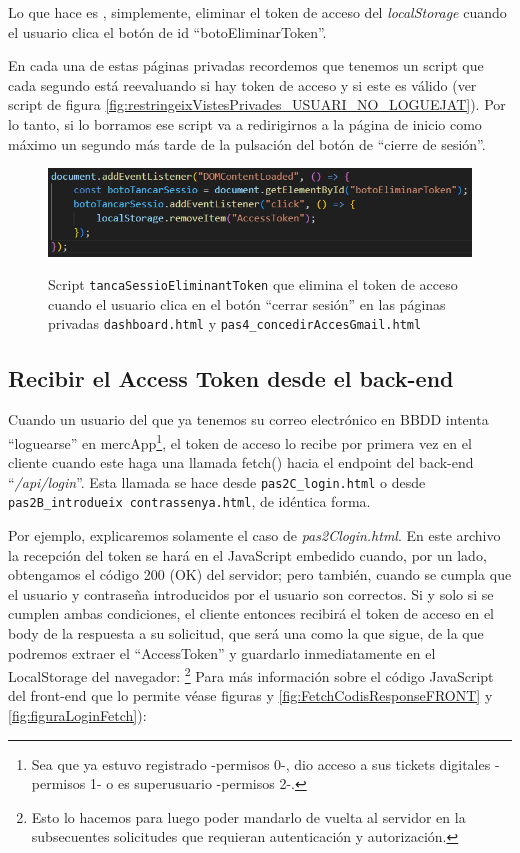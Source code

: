 \documentclass[a4paper,12pt]{report}
\begin{document}
	Lo que hace es , simplemente, eliminar el token de acceso del \textit{localStorage} cuando el usuario clica el botón de id ``botoEliminarToken''. 
	
	En cada una de estas páginas privadas recordemos que tenemos un script que cada segundo está reevaluando si hay token de acceso y si este es válido (ver script de figura \ref{fig:restringeixVistesPrivades_USUARI_NO_LOGUEJAT}). Por lo tanto, si lo borramos ese script va a redirigirnos a la página de inicio como máximo un segundo más tarde de la pulsación del botón de ``cierre de sesión''.
	
	\FloatBarrier
	\setlength{\abovecaptionskip}{15pt}
	\begin{figure}[H]
		\centering
		\caption{Script \texttt{tancaSessioEliminantToken} que elimina el token de acceso cuando el usuario clica en el botón ``cerrar sesión'' en las páginas privadas \texttt{dashboard.html} y \texttt{pas4\_concedirAccesGmail.html}}
		\includegraphics[width=1\linewidth]{img/scriptTancarSessio.png}
		\label{fig:scriptTancarSessio}
	\end{figure}
	\FloatBarrier
	
	
	
	\subsection{Recibir el Access Token desde el back-end}
	\label{sec:recibirAccesTokenENFRONTEND}
	
	Cuando un usuario del que ya tenemos su correo electrónico en BBDD intenta ``loguearse'' en mercApp\footnote{Sea que ya estuvo registrado -permisos 0-, dio acceso a sus tickets digitales -permisos 1- o es superusuario -permisos 2-.}, el token de acceso lo recibe por primera vez en el cliente cuando este haga una llamada fetch() hacia el endpoint del back-end ``\textit{/api/login}''. Esta llamada se hace desde \texttt{pas2C\_login.html} o desde \texttt{pas2B\_introdueix contrassenya.html}, de idéntica forma.
	
	
	Por ejemplo, explicaremos solamente el caso de \textit{pas2Clogin.html}. En este archivo la recepción del token se hará en el JavaScript embedido cuando, por un lado, obtengamos el código 200 (OK) del servidor; pero también, cuando se cumpla que el usuario y contraseña introducidos por el usuario son correctos. Si y solo si se cumplen ambas condiciones, el cliente entonces recibirá el token de acceso en el body de la respuesta a su solicitud, que será una como la que sigue, de la que podremos extraer el ``AccessToken'' y guardarlo inmediatamente en el LocalStorage del navegador: \footnote{Esto lo hacemos para luego poder mandarlo de vuelta al servidor en la subsecuentes solicitudes que requieran autenticación y autorización.} Para más información sobre el código JavaScript del front-end que lo permite véase figuras y \ref{fig:FetchCodisResponseFRONT} y \ref{fig:figuraLoginFetch}):
	
\end{document}
